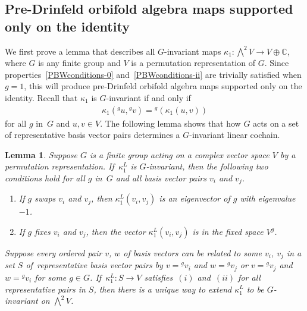 \documentclass[10pt,a4paper]{amsart}
\numberwithin{equation}{section}
\newtheorem{Lemma}[Theorem]{Lemma}
\newcommand{\actby}[1]{{}^{#1}}
\newcommand{\actbylessspace}[1]{{}^{#1}\!}
\begin{document}
\subsection{Pre-Drinfeld orbifold algebra maps supported only on the identity}
We first prove a lemma that describes all $G$-invariant maps $\kappa_1\colon \bigwedge^2 V\to V\oplus \mathbb{C}$,
where $G$ is any finite group and $V$ is a permutation representation of $G$. Since properties~\eqref{PBWconditions-0}
and~\eqref{PBWconditions-ii}
are trivially satisfied when $g=1$, this will produce pre-Drinfeld orbifold algebra
maps supported only on the identity.
Recall that $\kappa_1$ is $G$-invariant if and only if
\begin{gather}
\label{G-inv}
\kappa_1(\actby{g}u,\actby{g}v)=\actbylessspace{g}(\kappa_1(u,v))
\end{gather}
for all $g$ in~$G$ and $u,v\in V$.
The following lemma shows that how $G$ acts on a set of representative basis
vector pairs determines a $G$-invariant linear cochain.

\begin{Lemma}
\label{eigenvectors}
	Suppose $G$ is a finite group acting on a complex vector space $V$ by
	a permutation representation. If~$\kappa^L_1$ is $G$-invariant, then the following two conditions hold for all $g$ in~$G$ and all basis vector pairs $v_i$ and $v_j$.
	\begin{enumerate}[label=$(\roman*)$]\itemsep=0pt
		\item%
If $g$ swaps $v_i$ and $v_j$, then $\kappa^L_1(v_i,v_j)$ is an eigenvector of $g$ with eigenvalue $-1$.
		\item%
If $g$ fixes $v_i$ and $v_j$, then the vector $\kappa^L_1(v_i,v_j)$ is in the fixed space $V^g$.
	\end{enumerate}
Suppose every ordered pair $v$, $w$ of basis vectors can be related to some $v_i$, $v_j$ in a set $S$ of~repre\-sentative basis vector pairs by $v=\actby{g}v_i$ and $w=\actby{g}v_j$ or $v=\actby{g}v_j$ and $w=\actby{g}v_i$ for some $g \in G$. If~$\kappa^L_1\colon S \to V$ satisfies~$(i)$ and~$(ii)$ for all representative pairs in $S$, then there is a unique way to extend $\kappa^L_1$ to be $G$-invariant on $\bigwedge^2 V$.
\end{Lemma}
\end{document}
